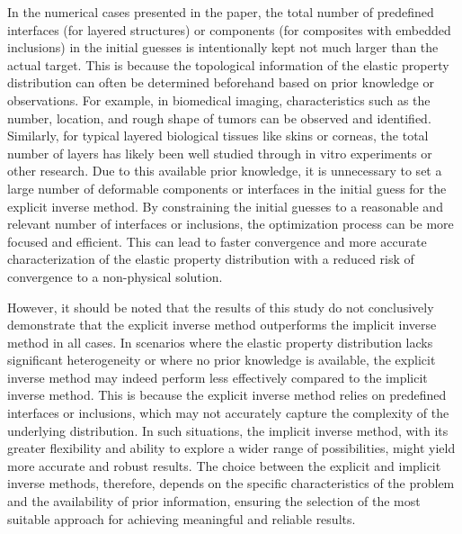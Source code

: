 \documentclass[11pt]{article}
\begin{document}
\vspace{1em}

\noindent
In the numerical cases presented in the paper, the total number
of predefined interfaces (for layered structures) or components
(for composites with embedded inclusions) in the initial guesses
is intentionally kept not much larger than the actual target.
This is because the topological information of the elastic
property distribution can often be determined beforehand based
on prior knowledge or observations. For example, in biomedical
imaging, characteristics such as the number, location, and rough
shape of tumors can be observed and identified. Similarly, for
typical layered biological tissues like skins or corneas, the
total number of layers has likely been well studied through in
vitro experiments or other research. Due to this available prior
knowledge, it is unnecessary to set a large number of
deformable components or interfaces in the initial guess for
the explicit inverse method. By constraining the initial guesses
to a reasonable and relevant number of interfaces or inclusions,
the optimization process can be more focused and efficient.
This can lead to faster convergence and more accurate
characterization of the elastic property distribution with a
reduced risk of convergence to a non-physical solution.

However, it should be noted that the results of this study do
not conclusively demonstrate that the explicit inverse method
outperforms the implicit inverse method in all cases. In
scenarios where the elastic property distribution lacks
significant heterogeneity or where no prior knowledge is
available, the explicit inverse method may indeed perform less
effectively compared to the implicit inverse method. This is
because the explicit inverse method relies on predefined
interfaces or inclusions, which may not accurately capture the
complexity of the underlying distribution. In such situations,
the implicit inverse method, with its greater flexibility and
ability to explore a wider range of possibilities, might yield
more accurate and robust results. The choice between the
explicit and implicit inverse methods, therefore, depends on
the specific characteristics of the problem and the availability
of prior information, ensuring the selection of the most
suitable approach for achieving meaningful and reliable results.
\end{document}
